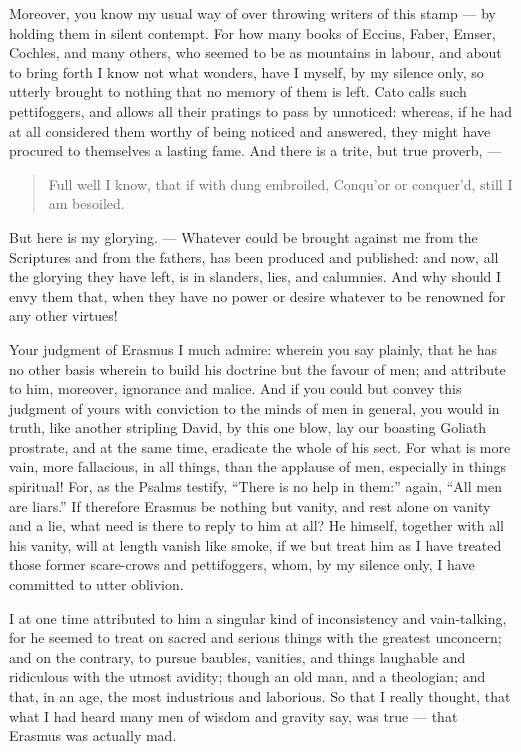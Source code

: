 Moreover, you know my usual way of over throwing writers of this stamp — by holding them in silent contempt. For how many books of Eccius, Faber, Emser, Cochles, and many others, who seemed to be as mountains in labour, and about to bring forth I know not what wonders, have I myself, by my silence only, so utterly brought to nothing that no memory of them is left. Cato calls such pettifoggers, and allows all their pratings to pass by unnoticed: whereas, if he had at all considered them worthy of being noticed and answered, they might have procured to themselves a lasting fame. And there is a trite, but true proverb, —

\begin{quote}

Full well I know, that if with dung embroiled, Conqu’or or conquer’d, still I am besoiled.

\end{quote}

But here is my glorying. — Whatever could be brought against me from the Scriptures and from the fathers, has been produced and published: and now, all the glorying they have left, is in slanders, lies, and calumnies. And why should I envy them that, when they have no power or desire whatever to be renowned for any other virtues!

Your judgment of Erasmus I much admire: wherein you say plainly, that he has no other basis wherein to build his doctrine but the favour of men; and attribute to him, moreover, ignorance and malice. And if you could but convey this judgment of yours with conviction to the minds of men in general, you would in truth, like another stripling David, by this one blow, lay our boasting Goliath prostrate, and at the same time, eradicate the whole of his sect. For what is more vain, more fallacious, in all things, than the applause of men, especially in things spiritual! For, as the Psalms testify, “There is no help in them:” again, “All men are liars.” If therefore Erasmus be nothing but vanity, and rest alone on vanity and a lie, what need is there to reply to him at all? He himself, together with all his vanity, will at length vanish like smoke, if we but treat him as I have treated those former scare-crows and pettifoggers, whom, by my silence only, I have committed to utter oblivion.

I at one time attributed to him a singular kind of inconsistency and vain-talking, for he seemed to treat on sacred and serious things with the greatest unconcern; and on the contrary, to pursue baubles, vanities, and things laughable and ridiculous with the utmost avidity; though an old man, and a theologian; and that, in an age, the most industrious and laborious. So that I really thought, that what I had heard many men of wisdom and gravity say, was true — that Erasmus was actually mad.

